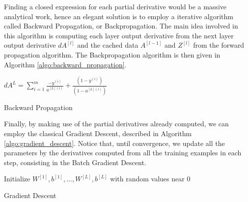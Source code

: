 Finding a closed expression for each partial derivative would be a massive analytical work, hence an elegant solution is to employ a iterative algorithm called Backward Propagation, or Backpropagation. The main idea involved in this algorithm is computing each layer output derivative from the next layer output derivative $dA^{[l]}$ and the cached data $A^{[l-1]}$ and $Z^{[l]}$ from the forward propagation algorithm. The Backpropagation algorithm is then given in Algorithm \ref{algo:backward_propagation}.

\begin{algorithm}[H]
    \DontPrintSemicolon
    \SetAlgoLined
    $dA^{L} = \sum_{i=1}^m{\frac{-y^{(i)}}{a^{[L](i)}} + \frac{(1-y^{(i)})}{(1-a^{[L](i)})}}$\;
    \caption{Backward Propagation}
    \label{algo:backward_propagation}
\end{algorithm}

Finally, by making use of the partial derivatives already computed, we can employ the classical Gradient Descent, described in Algorithm \ref{algo:gradient_descent}. Notice that, until convergence, we update all the parameters by the derivatives computed from all the training examples in each step, consisting in the Batch Gradient Descent.

\begin{algorithm}[H]
    \DontPrintSemicolon
    \SetAlgoLined
    Initialize $W^{[1]},b^{[1]},...,W^{[L]},b^{[L]}$ with random values near $0$\;
    \caption{Gradient Descent}
    \label{algo:gradient_descent}
\end{algorithm}


